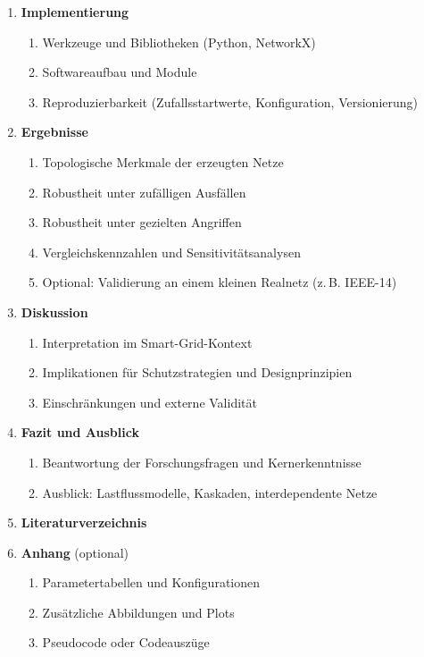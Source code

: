 \documentclass[12pt]{article} %
\begin{document}
\begin{enumerate}[label=\arabic*., leftmargin=*, itemsep=2pt]
  \item \textbf{Implementierung}
    \begin{enumerate}[label*=\arabic*., itemsep=1pt]
      \item Werkzeuge und Bibliotheken (Python, NetworkX)
      \item Softwareaufbau und Module
      \item Reproduzierbarkeit (Zufallsstartwerte, Konfiguration, Versionierung)
    \end{enumerate}

  \item \textbf{Ergebnisse}
    \begin{enumerate}[label*=\arabic*., itemsep=1pt]
      \item Topologische Merkmale der erzeugten Netze
      \item Robustheit unter zufälligen Ausfällen
      \item Robustheit unter gezielten Angriffen
      \item Vergleichskennzahlen und Sensitivitätsanalysen
      \item Optional: Validierung an einem kleinen Realnetz (z.\,B. IEEE-14)
    \end{enumerate}

  \item \textbf{Diskussion}
    \begin{enumerate}[label*=\arabic*., itemsep=1pt]
      \item Interpretation im Smart-Grid-Kontext
      \item Implikationen für Schutzstrategien und Designprinzipien
      \item Einschränkungen und externe Validität
    \end{enumerate}

  \item \textbf{Fazit und Ausblick}
    \begin{enumerate}[label*=\arabic*., itemsep=1pt]
      \item Beantwortung der Forschungsfragen und Kernerkenntnisse
      \item Ausblick: Lastflussmodelle, Kaskaden, interdependente Netze
    \end{enumerate}

  \item \textbf{Literaturverzeichnis}

  \item \textbf{Anhang} (optional)
    \begin{enumerate}[label*=\arabic*., itemsep=1pt]
      \item Parametertabellen und Konfigurationen
      \item Zusätzliche Abbildungen und Plots
      \item Pseudocode oder Codeauszüge
    \end{enumerate}

\end{enumerate}
\end{document}
